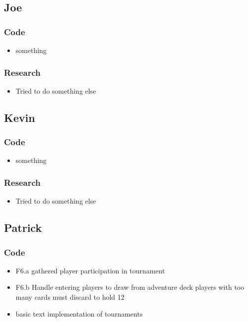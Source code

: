 \documentclass[10pt,a4paper]{article}
\begin{document}
\subsection*{Joe}

\subsubsection*{Code}
\begin{itemize}
\item something
\end{itemize}
\subsubsection*{Research}
\begin{itemize}
\item Tried to do something else
\end{itemize}

\subsection*{Kevin}

\subsubsection*{Code}
\begin{itemize}
\item something
\end{itemize}
\subsubsection*{Research}
\begin{itemize}
\item Tried to do something else
\end{itemize}

\subsection*{Patrick}

\subsubsection*{Code}
\begin{itemize}
\item F6.a gathered player participation in tournament
\item F6.b Handle entering players to draw from adventure deck players with too many cards must discard to hold 12
\item basic text implementation of tournaments
\end{itemize}
\end{document}
